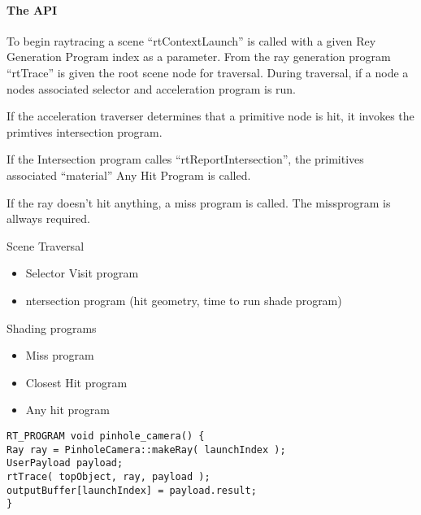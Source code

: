 \paragraph{The API}

To begin raytracing a scene ``rtContextLaunch'' is called with a given Rey Generation Program index as a parameter. From the ray generation program ``rtTrace'' is given the root scene node for traversal. During traversal, if a node a nodes associated selector and acceleration program is run.

\par
If the acceleration traverser determines that a primitive node is hit, it invokes the primtives intersection program.

\par
If the Intersection program calles ``rtReportIntersection'', the primitives associated ``material'' Any Hit Program is called.

\par
If the ray doesn't hit anything, a miss program is called. The missprogram is allways required.

Scene Traversal
\begin{itemize}
\item Selector Visit program
\item ntersection program (hit geometry, time to run shade program)
\end{itemize}

Shading programs
\begin{itemize}
	\item Miss program
  \item Closest Hit program
  \item Any hit program
\end{itemize}

\begin{verbatim}
RT_PROGRAM void pinhole_camera() {
Ray ray = PinholeCamera::makeRay( launchIndex );
UserPayload payload;
rtTrace( topObject, ray, payload );
outputBuffer[launchIndex] = payload.result;
}
\end{verbatim}
